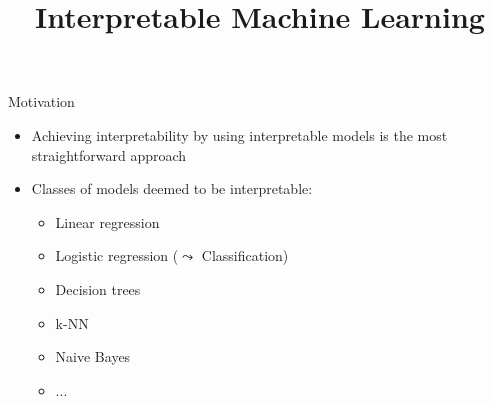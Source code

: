 \documentclass[11pt,compress,t,notes=noshow, xcolor=table]{beamer}
\title{Interpretable Machine Learning}
\institute{\href{https://compstat-lmu.github.io/lecture_iml/}{compstat-lmu.github.io/lecture\_iml}}
\date{}
\begin{document}


\newcommand{\titlefigure}{figure/whitebox}
\newcommand{\learninggoals}{
\item What characteristics does an interpretable model have
\item Why we should use interpretable models
\item Examples for interpretable models: linear and polynomial regression models, generalized linear models, generalized additive models, model-based boosting, rule-based learning}





\begin{vbframe}{Motivation}

    \begin{itemize}
        \item Achieving interpretability by using interpretable models is the most straightforward approach
        
        \item Classes of models deemed to be interpretable:
        \begin{itemize}
            \item Linear regression
            \item Logistic regression ($\leadsto$ Classification)
            \item Decision trees
            \item k-NN
            \item Naive Bayes
            \item ...
        \end{itemize}
    \end{itemize}	
	
\end{vbframe}
	
\end{document}
